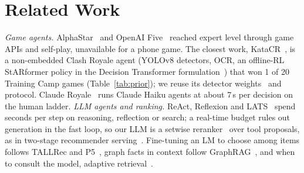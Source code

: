 \section{Related Work}
\label{sec:related}

\emph{Game agents.} AlphaStar~\cite{vinyals2019alphastar} and OpenAI Five~\cite{berner2019dota} reached expert level through game APIs and self-play, unavailable for a phone game. The closest work, KataCR~\cite{wu2025nonembedded}, is a non-embedded Clash Royale agent (YOLOv8 detectors, OCR, an offline-RL StARformer policy in the Decision Transformer formulation~\cite{chen2021dt}) that won 1 of 20 Training Camp games (Table~\ref{tab:prior}); we reuse its detector weights~\cite{wu2024katacr} and protocol. Claude Royale~\cite{houseworth2025claudeRoyale} runs Claude Haiku agents at about 7\,s per decision on the human ladder. %
\emph{LLM agents and ranking.} ReAct, Reflexion and LATS~\cite{yao2023react,shinn2023reflexion,zhou2024lats} spend seconds per step on reasoning, reflection or search; a real-time budget rules out generation in the fast loop, so our LLM is a setwise reranker~\cite{zhuang2024setwise,sun2023rankgpt} over tool proposals, as in two-stage recommender serving~\cite{yi2019twotower,lim2026l13}. Fine-tuning an LM to choose among items follows TALLRec and P5~\cite{bao2023tallrec,geng2022p5}, graph facts in context follow GraphRAG~\cite{edge2024graphrag}, and when to consult the model, adaptive retrieval~\cite{jiang2023flare,jeong2024adaptiverag}.
